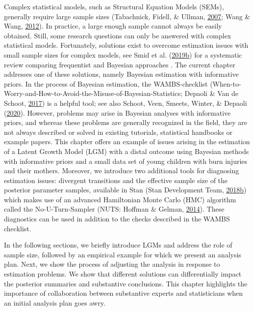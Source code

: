 \documentclass[openright,titlepage,12pt,a4paper]{book}
\begin{document}
Complex statistical models, such as Structural Equation Models (SEMs), generally require large sample sizes (Tabachnick, Fidell, \& Ullman, \protect\hyperlink{ref-tabachnick_using_2007}{2007}; Wang \& Wang, \protect\hyperlink{ref-wang_structural_2012}{2012}). In practice, a large enough sample cannot always be easily obtained. Still, some research questions can only be answered with complex statistical models. Fortunately, solutions exist to overcome estimation issues with small sample sizes for complex models, see Smid et al. (\protect\hyperlink{ref-smid_bayesian_2019}{2019}\protect\hyperlink{ref-smid_bayesian_2019}{b}) for a systematic review comparing frequentist and Bayesian approaches . The current chapter addresses one of these solutions, namely Bayesian estimation with informative priors. In the process of Bayesian estimation, the WAMBS-checklist (When-to-Worry-and-How-to-Avoid-the-Misuse-of-Bayesian-Statistics; Depaoli \& Van de Schoot, \protect\hyperlink{ref-depaoli_improving_2017}{2017}) is a helpful tool; see also Schoot, Veen, Smeets, Winter, \& Depaoli (\protect\hyperlink{ref-van_de_schoot_tutorial_2020}{2020}). However, problems may arise in Bayesian analyses with informative priors, and whereas these problems are generally recognized in the field, they are not always described or solved in existing tutorials, statistical handbooks or example papers. This chapter offers an example of issues arising in the estimation of a Latent Growth Model (LGM) with a distal outcome using Bayesian methods with informative priors and a small data set of young children with burn injuries and their mothers. Moreover, we introduce two additional tools for diagnosing estimation issues: divergent transitions and the effective sample size of the posterior parameter samples, available in Stan (Stan Development Team, \protect\hyperlink{ref-stan_development_team_rstan:_2018}{2018}\protect\hyperlink{ref-stan_development_team_rstan:_2018}{b}) which makes use of an advanced Hamiltonian Monte Carlo (HMC) algorithm called the No-U-Turn-Sampler (NUTS: Hoffman \& Gelman, \protect\hyperlink{ref-hoffman_no-u-turn_2014}{2014}). These diagnostics can be used in addition to the checks described in the WAMBS checklist.

In the following sections, we briefly introduce LGMs and address the role of sample size, followed by an empirical example for which we present an analysis plan. Next, we show the process of adjusting the analysis in response to estimation problems. We show that different solutions can differentially impact the posterior summaries and substantive conclusions. This chapter highlights the importance of collaboration between substantive experts and statisticians when an initial analysis plan goes awry.
\end{document}
